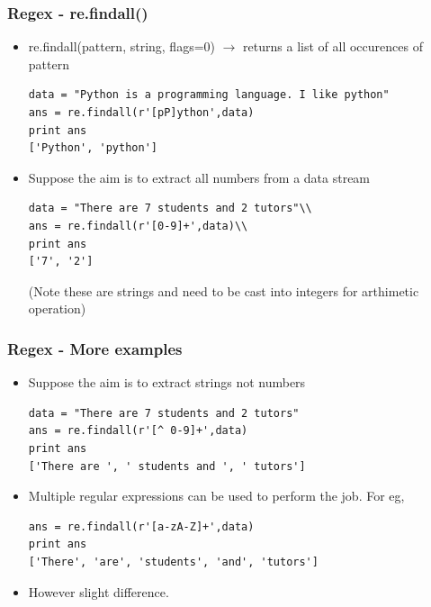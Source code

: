 \documentclass[xcolor=table]{beamer}
\begin{document}
\begin{frame}[fragile]
\frametitle{Regex - re.findall()}
\begin{itemize}
\item re.findall(pattern, string, flags=0) $\rightarrow$ returns a list of all occurences of pattern\\
\tiny
\begin{verbatim}
data = "Python is a programming language. I like python"
ans = re.findall(r'[pP]ython',data)
print ans
['Python', 'python']
\end{verbatim}
\small
\item Suppose the aim is to extract all numbers from a data stream
\tiny
\begin{verbatim}
data = "There are 7 students and 2 tutors"\\
ans = re.findall(r'[0-9]+',data)\\
print ans
['7', '2']
\end{verbatim}
\small
(Note these are strings and need to be cast into integers for arthimetic operation)\\
\end{itemize}
\end{frame}



\begin{frame}[fragile]
\frametitle{Regex - More examples}
\begin{itemize}
\item Suppose the aim is to extract strings not numbers
\tiny
\begin{verbatim}
data = "There are 7 students and 2 tutors"
ans = re.findall(r'[^ 0-9]+',data)
print ans
['There are ', ' students and ', ' tutors']
\end{verbatim}
\small
\item Multiple regular expressions can be used to perform the job. For eg,\\
\tiny
\begin{verbatim}
ans = re.findall(r'[a-zA-Z]+',data)
print ans
['There', 'are', 'students', 'and', 'tutors']
\end{verbatim}
\small
\item However slight difference. 
\end{itemize}
\end{frame}
\end{document}
